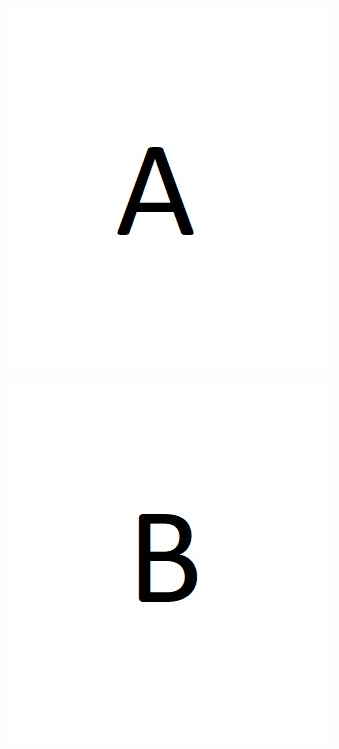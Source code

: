 \documentclass[a4paper]{article}
\begin{document}
\begin{figure}[h]
	\centering
	\begin{subfigure}[t]{0.4\textwidth}
		\includegraphics[width=0.5\linewidth]{A} 
		\caption{}
		\label{fig:subplot_A}
	\end{subfigure}
	\hfill
	\begin{subfigure}[t]{0.4\textwidth}
		\includegraphics[width=0.5\linewidth]{B}
		\caption{}
		\label{fig:subplot_B}
	\end{subfigure}
	

\end{figure}
\end{document}
